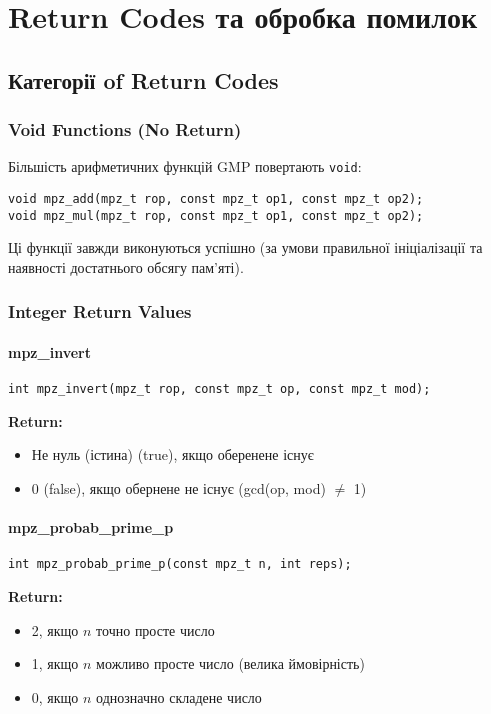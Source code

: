 \newpage
\section{Return Codes та обробка помилок}

\subsection{Категорії of Return Codes}

\subsubsection{Void Functions (No Return)}
Більшість арифметичних функцій GMP повертають \texttt{void}:
\begin{verbatim}
void mpz_add(mpz_t rop, const mpz_t op1, const mpz_t op2);
void mpz_mul(mpz_t rop, const mpz_t op1, const mpz_t op2);
\end{verbatim}

Ці функції завжди виконуються успішно (за умови правильної ініціалізації та наявності достатнього обсягу пам'яті).

\subsubsection{Integer Return Values}

\paragraph{mpz\_invert}
\begin{verbatim}
int mpz_invert(mpz_t rop, const mpz_t op, const mpz_t mod);
\end{verbatim}
\textbf{Return:}
\begin{itemize}
    \item Не нуль (істина) (true), якщо оберенене існує
    \item 0 (false), якщо обернене не існує (gcd(op, mod) $\neq$ 1)
\end{itemize}

\paragraph{mpz\_probab\_prime\_p}
\begin{verbatim}
int mpz_probab_prime_p(const mpz_t n, int reps);
\end{verbatim}
\textbf{Return:}
\begin{itemize}
    \item 2, якщо $n$ точно просте число
    \item 1, якщо $n$ можливо просте число (велика ймовірність)
    \item 0, якщо $n$ однозначно складене число
\end{itemize}

